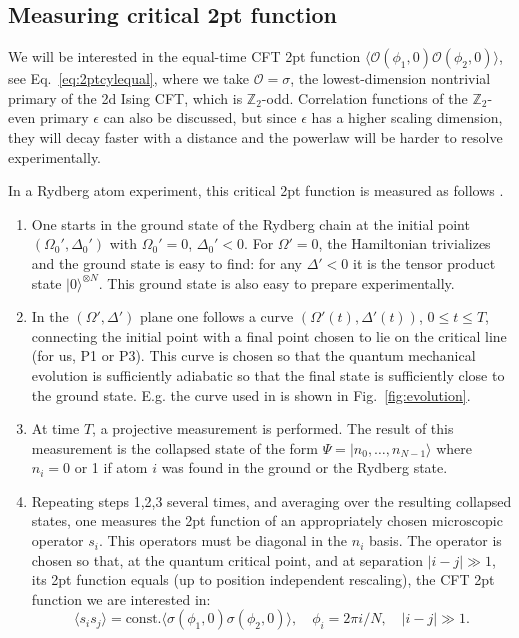 \documentclass[a4paper,12pt]{article}
\theoremstyle{remark}
\theoremstyle{theorem}
\begin{document}
\subsection{Measuring critical 2pt function}\label{sec:measuring-critical-2pt-point-function}

We will be interested in the equal-time CFT 2pt function $\langle
\mathcal{O}(\phi_1, 0)\mathcal{O}(\phi_2, 0) \rangle$, see
Eq.~\eqref{eq:2ptcylequal}, where we take $\mathcal{O}= \sigma$, the
lowest-dimension nontrivial primary of the 2d Ising CFT, which is $\mathbb{Z}_2$-odd. Correlation functions
of the $\mathbb{Z}_2$-even primary $\epsilon$ can also be discussed, but since $\epsilon$ has a higher scaling
dimension, they will decay faster with a distance and the powerlaw will be
harder to resolve experimentally.

In a Rydberg atom experiment, this critical 2pt function is measured as
follows {\cite{Fang:2024uyf}}.
\begin{enumerate}
	\item One starts in the ground state of the Rydberg chain at the initial
	point $(\Omega_0', \Delta_0')$ with $\Omega_0' = 0$, $\Delta_0' < 0$. For
	$\Omega' = 0$, the Hamiltonian trivializes and the ground state is easy to
	find: for any $\Delta' < 0$ it is the tensor product state $| 0
	\rangle^{\otimes N}$. This ground state is also easy to prepare
	experimentally.
	
	\item In the $(\Omega', \Delta')$ plane one follows a curve $(\Omega' (t), \Delta' (t))$, $0 \leqslant t
	\leqslant T$, connecting the initial
	point with a final point chosen to lie on the critical line (for us, P1 or
	P3). This curve is chosen so that the quantum mechanical evolution is
	sufficiently adiabatic so that the final state is sufficiently close to the
	ground state. E.g. the curve used in {\cite{Fang:2024uyf}} is shown in
	Fig.~\ref{fig:evolution}.
		
	\item At time $T$, a projective measurement is performed. The result of this
	measurement is the collapsed state of the form $\Psi  = | n_0, \ldots, n_{N-1}
	\rangle$ where $n_i = 0$ or 1 if atom $i$ was found in the ground or the
	Rydberg state.
	
	\item Repeating steps 1,2,3 several times, and averaging over the resulting
	collapsed states, one measures the 2pt function of an appropriately chosen
	microscopic operator $s_i$. This operators must be diagonal in the $n_i$
	basis. The operator is chosen so that, at the quantum critical point, and at
	separation $| i - j | \gg 1$, its 2pt function equals (up to position
	independent rescaling), the CFT 2pt function we are interested in:
	\begin{equation}
		\langle s_i s_j \rangle =\text{const.} \langle \sigma
		(\phi_1, 0) \sigma (\phi_2, 0) \rangle, \quad \phi_i = 2 \pi i / N, \quad
		| i - j | \gg 1. \label{ssCFT}
	\end{equation}
\end{enumerate}
\end{document}
